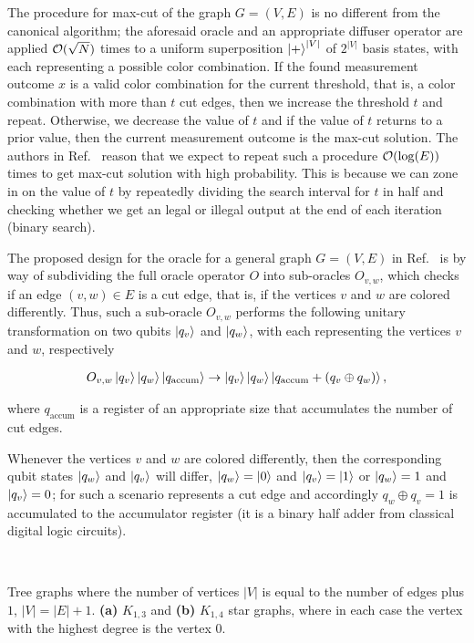 \bigskip
\noindent
The procedure for \acs{max-cut} of the graph $G = (V,E)$ is no different from the canonical algorithm; the aforesaid oracle and an appropriate diffuser operator are applied $\mathcal{O}(\sqrt{N})$ times to a uniform superposition $\ket{+}^{|V|}$ of $2^{|V|}$ basis states, with each representing a possible color combination. If the found measurement outcome $x$ is a valid color combination for the current threshold, that is, a color combination with more than $t$ cut edges, then we increase the threshold $t$ and repeat. Otherwise, we decrease the value of $t$ and if the value of $t$ returns to a prior value, then the current measurement outcome is the \acs{max-cut} solution. The authors in Ref.~\cite{Satoh_2020} reason that we expect to repeat such a procedure $\mathcal{O}(\log(E))$ times to get \acs{max-cut} solution with high probability. This is because we can zone in on the value of $t$ by repeatedly dividing the search interval for $t$ in half and checking whether we get an legal or illegal output at the end of each iteration (binary search). 

\bigskip
\noindent
The proposed design for the oracle for a general graph $G=(V,E)$ in Ref.~\cite{Satoh_2020} is by way of subdividing the full oracle operator $O$ into sub-oracles $O_{v,w}$, which checks if an edge $(v,w) \in E$ is a cut edge, that is, if the vertices $v$ and $w$ are colored differently. Thus, such a sub-oracle $O_{v,w}$ performs the following unitary transformation on two qubits $\ket{q_v}$ and $\ket{q_w}$, with each representing the vertices $v$ and $w$, respectively

\begin{align}
	O_{v,w}\ket{q_v}\ket{q_w}\ket{q_{\text{accum}}} \to  \ket{q_v}\ket{q_w}\ket{q_{\text{accum}} + (q_v \oplus q_w)},
\end{align}

\noindent
where $q_{\text{accum}}$ is a register of an appropriate size that accumulates the number of cut edges. 

\clearpage
\noindent
Whenever the vertices $v$ and $w$ are colored differently, then the corresponding qubit states $\ket{q_w}$ and $\ket{q_v}$ will differ, \ie $\ket{q_w} = \ket{0}$ and $\ket{q_v} = \ket{1}$ or $\ket{q_w} = 1$ and $\ket{q_v}=0$; for such a scenario represents a cut edge and accordingly $q_w\oplus q_v = 1$ is accumulated to the accumulator register (it is a binary half adder from classical digital logic circuits).

\begin{marginfigure}
	\centering
	 \\
    \caption[Tree graphs where the number of vertices $|V|$ is equal to the number of edges plus $1$, $|V| = |E| + 1$]{Tree graphs where the number of vertices $|V|$ is equal to the number of edges plus $1$, $|V| = |E| + 1$. \textbf{(a)} $K_{1,3}$ and \textbf{(b)} $K_{1,4}$ star graphs, where in each case the vertex with the highest degree is the vertex $0$.}
\end{marginfigure}

